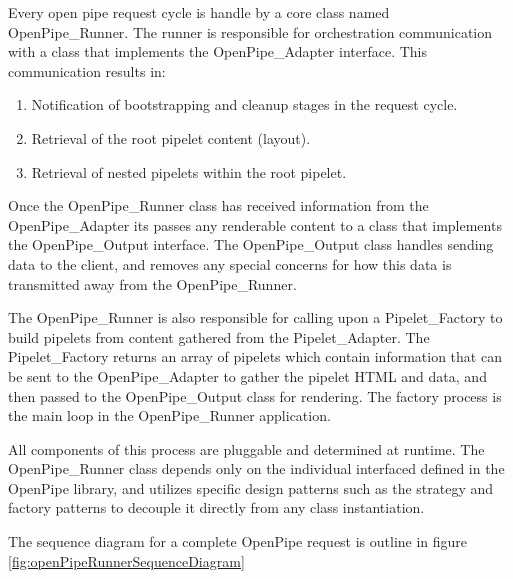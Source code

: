 \documentclass[12pt]{report}
\begin{document}
Every open pipe request cycle is handle by a core class named OpenPipe\_Runner. The runner is responsible for orchestration communication with a class that implements the OpenPipe\_Adapter interface. This communication results in:

\begin{enumerate}
\item Notification of bootstrapping and cleanup stages in the request cycle.
\item Retrieval of the root pipelet content (layout).
\item Retrieval of nested pipelets within the root pipelet.
\end{enumerate}

Once the OpenPipe\_Runner class has received information from the OpenPipe\_Adapter its passes any renderable content to a class that implements the OpenPipe\_Output interface. The OpenPipe\_Output class handles sending data to the client, and removes any special concerns for how this data is transmitted away from the OpenPipe\_Runner.

The OpenPipe\_Runner is also responsible for calling upon a Pipelet\_Factory to build pipelets from content gathered from the Pipelet\_Adapter. The Pipelet\_Factory returns an array of pipelets which contain information that can be sent to the OpenPipe\_Adapter to gather the pipelet HTML and data, and then passed to the OpenPipe\_Output class for rendering. The factory process is the main loop in the OpenPipe\_Runner application.

All components of this process are pluggable and determined at runtime. The OpenPipe\_Runner class depends only on the individual interfaced defined in the OpenPipe library, and utilizes specific design patterns such as the strategy and factory patterns to decouple it directly from any class instantiation.

The sequence diagram for a complete OpenPipe request is outline in figure \ref{fig:openPipeRunnerSequenceDiagram}
\end{document}
